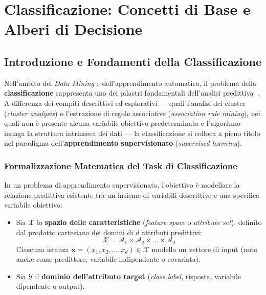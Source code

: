 \chapter{Classificazione: Concetti di Base e Alberi di Decisione}
\label{ch:dm-classification-decision-trees}

\section{Introduzione e Fondamenti della Classificazione}
\label{sec:dm-classif-intro}

Nell'ambito del \textit{Data Mining} e dell'apprendimento automatico, il problema della \textbf{classificazione} rappresenta uno dei pilastri fondamentali dell'analisi predittiva~\cite{tan2018}. A differenza dei compiti descrittivi ed esplorativi --- quali l'analisi dei cluster (\textit{cluster analysis}) o l'estrazione di regole associative (\textit{association rule mining}), nei quali non è presente alcuna variabile obiettivo predeterminata e l'algoritmo indaga la struttura intrinseca dei dati --- la classificazione si colloca a pieno titolo nel paradigma dell'\textbf{apprendimento supervisionato} (\textit{supervised learning}).

\FloatBarrier
\subsection{Formalizzazione Matematica del Task di Classificazione}
\label{subsec:dm-classif-formalism}

In un problema di apprendimento supervisionato, l'obiettivo è modellare la relazione predittiva esistente tra un insieme di variabili descrittive e una specifica variabile obiettivo:
\begin{itemize}
    \item Sia $\mathcal{X}$ lo \textbf{spazio delle caratteristiche} (\textit{feature space} o \textit{attribute set}), definito dal prodotto cartesiano dei domini di $d$ attributi predittivi:
    \begin{equation}
        \mathcal{X} = \mathcal{A}_1 \times \mathcal{A}_2 \times \dots \times \mathcal{A}_d
    \end{equation}
    Ciascuna istanza $\mathbf{x} = (x_1, x_2, \dots, x_d) \in \mathcal{X}$ modella un vettore di input (noto anche come predittore, variabile indipendente o covariata).
    \item Sia $\mathcal{Y}$ il \textbf{dominio dell'attributo target} (\textit{class label}, risposta, variabile dipendente o output).
\end{itemize}

